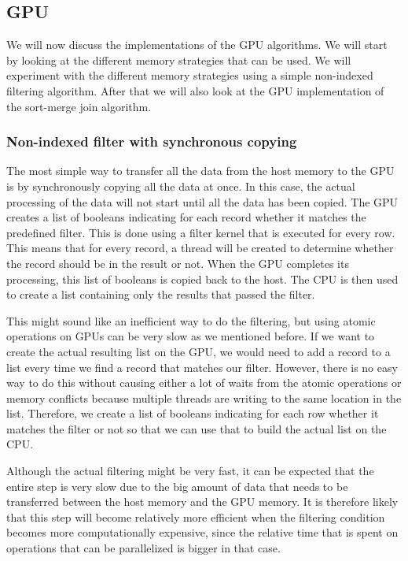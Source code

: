 \documentclass[a4paper,titlepage]{article}
\begin{document}
\subsection{GPU}
\label{sec:gpu-implementation}
We will now discuss the implementations of the GPU algorithms. We will start by looking at the different memory strategies that can be used. We will experiment with the different memory strategies using a simple non-indexed filtering algorithm. After that we will also look at the GPU implementation of the sort-merge join algorithm.

\subsubsection{Non-indexed filter with synchronous copying}
\label{sec:filter-synchronous}
The most simple way to transfer all the data from the host memory to the GPU is by synchronously copying all the data at once. In this case, the actual processing of the data will not start until all the data has been copied. The GPU creates a list of booleans indicating for each record whether it matches the predefined filter. This is done using a filter kernel that is executed for every row. This means that for every record, a thread will be created to determine whether the record should be in the result or not. When the GPU completes its processing, this list of booleans is copied back to the host. The CPU is then used to create a list containing only the results that passed the filter.

This might sound like an inefficient way to do the filtering, but using atomic operations on GPUs can be very slow as we mentioned before. If we want to create the actual resulting list on the GPU, we would need to add a record to a list every time we find a record that matches our filter. However, there is no easy way to do this without causing either a lot of waits from the atomic operations or memory conflicts because multiple threads are writing to the same location in the list. Therefore, we create a list of booleans indicating for each row whether it matches the filter or not so that we can use that to build the actual list on the CPU.

Although the actual filtering might be very fast, it can be expected that the entire step is very slow due to the big amount of data that needs to be transferred between the host memory and the GPU memory. It is therefore likely that this step will become relatively more efficient when the filtering condition becomes more computationally expensive, since the relative time that is spent on operations that can be parallelized is bigger in that case.
\end{document}
